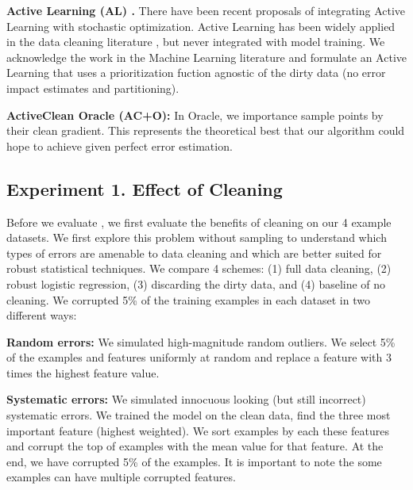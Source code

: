 \vspace{0.5em}

\noindent\textbf{Active Learning (AL) \cite{guillory2009active}. } There have been recent proposals of integrating Active Learning with stochastic optimization. Active Learning has been widely applied in the data cleaning literature \cite{gokhale2014corleone}, but never integrated with model training. We acknowledge the work in the Machine Learning literature and formulate an Active Learning that uses a prioritization fuction agnostic of the dirty data (no error impact estimates and partitioning). 

\vspace{0.5em}

\noindent\textbf{ActiveClean Oracle (AC+O): } In \sys Oracle, we importance sample points by their clean gradient. This represents the theoretical best that our algorithm could hope to achieve given perfect error estimation.

\subsection{Experiment 1. Effect of Cleaning}
Before we evaluate \sys, we first evaluate the benefits of cleaning on our 4 example datasets.
We first explore this problem without sampling to understand which types of errors are amenable to data cleaning and which are better suited for robust statistical techniques.
We compare 4 schemes: (1) full data cleaning, (2) robust logistic regression, (3) discarding the dirty data, and (4) baseline of no cleaning. We corrupted 5\% of the training examples in each dataset in two different ways:

\vspace{0.5em}

\noindent\textbf{Random errors: } We simulated high-magnitude random outliers. We select 5\% of the examples and features uniformly at random and replace a feature with 3 times the highest feature value.

\vspace{0.5em}

\noindent\textbf{Systematic errors: } We simulated innocuous looking (but still incorrect) systematic errors. We trained the model on the clean data, find the three most important feature (highest weighted). We sort examples by each these features and corrupt the top of examples with the mean value for that feature. 
At the end, we have corrupted 5\% of the examples.
It is important to note the some examples can have multiple corrupted features.


